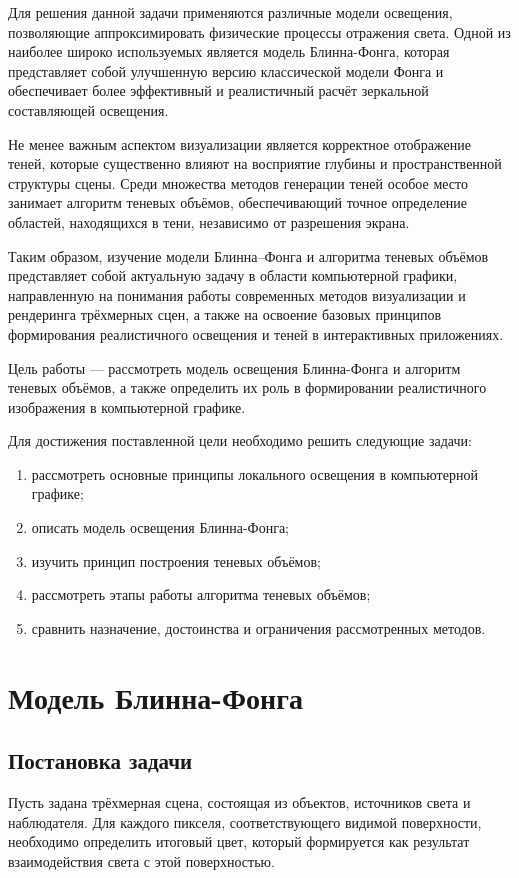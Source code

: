 \documentclass[a4paper, 12pt]{article}
\begin{document}
Для решения данной задачи применяются различные модели освещения, позволяющие аппроксимировать физические процессы отражения света. Одной из наиболее широко используемых является модель Блинна-Фонга, которая представляет собой улучшенную версию классической модели Фонга и обеспечивает более эффективный и реалистичный расчёт зеркальной составляющей освещения.

Не менее важным аспектом визуализации является корректное отображение теней, которые существенно влияют на восприятие глубины и пространственной структуры сцены. Среди множества методов генерации теней особое место занимает алгоритм теневых объёмов, обеспечивающий точное определение областей, находящихся в тени, независимо от разрешения экрана.

Таким образом, изучение модели Блинна–Фонга и алгоритма теневых объёмов представляет собой актуальную задачу в области компьютерной графики, направленную на понимания работы современных методов визуализации и рендеринга трёхмерных сцен, а также на освоение базовых принципов формирования реалистичного освещения и теней в интерактивных приложениях.

Цель работы --- рассмотреть модель освещения Блинна-Фонга и алгоритм теневых объёмов, а также определить их роль в формировании реалистичного изображения в компьютерной графике.

Для достижения поставленной цели необходимо решить следующие задачи:
\begin{enumerate}
	\item рассмотреть основные принципы локального освещения в компьютерной графике;
	\item описать модель освещения Блинна-Фонга;
	\item изучить принцип построения теневых объёмов;
	\item рассмотреть этапы работы алгоритма теневых объёмов;
	\item сравнить назначение, достоинства и ограничения рассмотренных методов.
\end{enumerate}

\newpage
\section{Модель Блинна-Фонга}
\subsection{Постановка задачи}
Пусть задана трёхмерная сцена, состоящая из объектов, источников света и наблюдателя. Для каждого пикселя, соответствующего видимой поверхности, необходимо определить итоговый цвет, который формируется как результат взаимодействия света с этой поверхностью.
\end{document}
